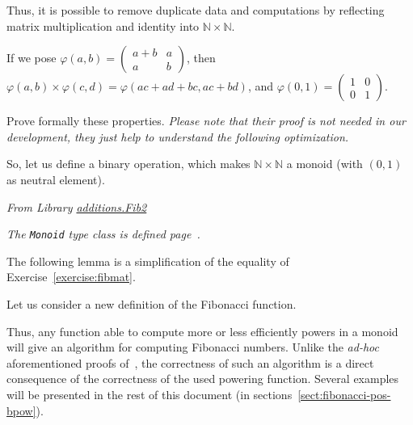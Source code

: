Thus, it is possible to remove duplicate data and computations by reflecting matrix multiplication and identity into $\mathbb{N}\times\mathbb{N}$.

If we pose $\varphi(a,b) =\left(
  \begin{array}{cc}
    a+b  & a \\
    a & b
  \end{array}
\right)$, then $\varphi(a,b)\times \varphi(c,d)=\varphi(ac + ad + bc, ac + bd)$, and
$\varphi(0,1)=  \left(
  \begin{array}{cc}
    1 & 0 \\
    0 & 1 
  \end{array}
\right) $.

\begin{exercise}
  Prove formally these properties. \emph{Please note that their proof is not needed in our development, they just help to understand the following optimization.}
\end{exercise}


So, let us define a binary operation, which makes $\mathbb{N}\times\mathbb{N}$ a monoid (with $(0,1)$ as neutral element).


\emph{From Library
\href{../theories/html/additions.Fib2.html}{additions.Fib2}} 

\emph{The \texttt{Monoid} type class is defined 
page~\pageref{sect:monoid-def}.}



The following lemma is a simplification of the equality of Exercise~\ref{exercise:fibmat}.


Let us consider a new definition of the Fibonacci function.



Thus, any function able to compute more or less efficiently powers in a monoid will
give an algorithm for computing Fibonacci numbers. Unlike the \emph{ad-hoc} aforementioned proofs of~\cite{BC04}, the correctness of such an algorithm is a direct consequence
of the correctness of the used powering function.
Several examples will be presented in the rest of this document
(in sections~\vref{sect:fibonacci-pos-bpow}).






